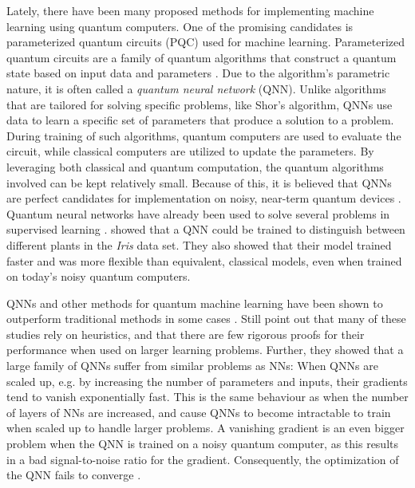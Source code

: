Lately, there have been many proposed methods for implementing machine learning using quantum computers. One of the promising candidates is parameterized quantum circuits (PQC) used for machine learning. Parameterized quantum circuits are a family of quantum algorithms that construct a quantum state based on input data and parameters \cite{Benedetti_2019}. Due to the algorithm's parametric nature, it is often called a \emph{quantum neural network} (QNN). Unlike algorithms that are tailored for solving specific problems, like Shor's algorithm, QNNs use data to learn a specific set of parameters that produce a solution to a problem. During training of such algorithms, quantum computers are used to evaluate the circuit, while classical computers are utilized to update the parameters. By leveraging both classical and quantum computation, the quantum algorithms involved can be kept relatively small. Because of this, it is believed that QNNs are perfect candidates for implementation on noisy, near-term quantum devices \cite{Cerezo_2021}. Quantum neural networks have already been used to solve several problems in supervised learning \cite{Benedetti_2019, abbas2020power, lloyd2018quantum}. \citet{abbas2020power} showed that a QNN could be trained to distinguish between different plants in the \emph{Iris} data set. They also showed that their model trained faster and was more flexible than equivalent, classical models, even when trained on today's noisy quantum computers.

QNNs and other methods for quantum machine learning have been shown to outperform traditional methods in some cases \cite{abbas2020power}. Still \citet{McClean_2018} point out that many of these studies rely on heuristics, and that there are few rigorous proofs for their performance when used on larger learning problems. Further, they showed that a large family of QNNs suffer from similar problems as NNs: When QNNs are scaled up, e.g. by increasing the number of parameters and inputs, their gradients tend to vanish exponentially fast. This is the same behaviour as when the number of layers of NNs are increased, and cause QNNs to become intractable to train when scaled up to handle larger problems. A vanishing gradient is an even bigger problem when the QNN is trained on a noisy quantum computer, as this results in a bad signal-to-noise ratio for the gradient. Consequently, the optimization of the QNN fails to converge \cite{skolik2020layerwise}.

